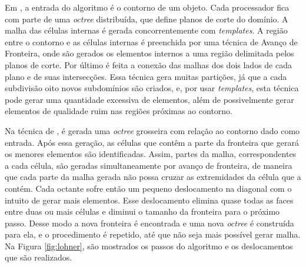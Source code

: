 Em \cite{bib:deCougny99}, a entrada do algoritmo é o contorno de um objeto. Cada processador fica com parte de uma \textit{octree} distribuída, que define planos de corte do domínio. A malha das células internas é gerada concorrentemente com \textit{templates}. A região entre o contorno e as células internas é preenchida por uma técnica de Avanço de Fronteira, onde são gerados os elementos internos a uma região delimitada pelos planos de corte. Por último é feita a conexão das malhas dos dois lados de cada plano e de suas intersecções. Essa técnica gera muitas partições, já que a cada subdivisão oito novos subdomínios são criados, e, por usar \textit{templates}, esta técnica pode gerar uma quantidade excessiva de elementos, além de possivelmente gerar elementos de qualidade ruim nas regiões próximas ao contorno.

Na técnica de \cite{bib:Lohner01}, é gerada uma \textit{octree} grosseira com relação ao contorno dado como entrada. Após essa geração, as células que contêm a parte da fronteira que gerará os menores elementos são identificadas. Assim, partes da malha, correspondentes a cada célula, são geradas simultaneamente por avanço de fronteira, de maneira que cada parte da malha gerada não possa cruzar as extremidades da célula que a contém. Cada octante sofre então um pequeno deslocamento na diagonal com o intuito de gerar mais elementos. Esse deslocamento elimina quase todas as faces entre duas ou mais células e diminui o tamanho da fronteira para o próximo passo. Desse modo a nova fronteira é encontrada e uma nova \textit{octree} é construída para ela, e o procedimento é repetido, até que não seja mais possível gerar malha. Na Figura \ref{fig:lohner}, são mostrados os passos do algoritmo e os deslocamentos que são realizados.


